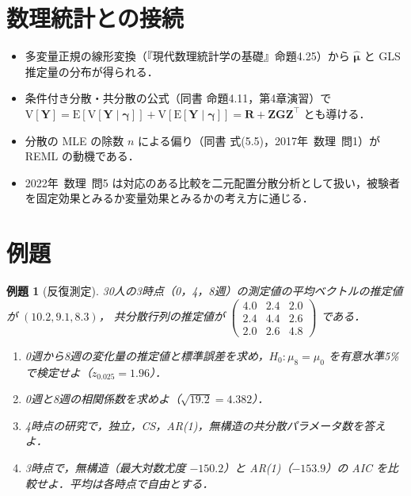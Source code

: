 \documentclass[a4paper,11pt,openany]{ltjsbook}
\newtheorem{reidai}{例題}[chapter]
\newcommand{\kakomonSM}[2]{\mbox{#1年 数理 問#2}}
\newcommand{\E}{\mathrm{E}}
\newcommand{\V}{\mathrm{V}}
\newcommand{\transp}{^{\top}}
\begin{document}
\section{数理統計との接続}\label{sec:08-link}
\begin{linkbox}
\begin{itemize}
\item 多変量正規の線形変換（『現代数理統計学の基礎』命題4.25）から $\hat{\bm\mu}$ と GLS 推定量の分布が得られる．
\item 条件付き分散・共分散の公式（同書 命題4.11，第4章演習）で $\V[\bm Y]=\E[\V[\bm Y\mid\bm\gamma]]+\V[\E[\bm Y\mid\bm\gamma]]=\bm R+\bm Z\bm G\bm Z\transp$ とも導ける．
\item 分散の MLE の除数 $n$ による偏り（同書 式(5.5)，\kakomonSM{2017}{1}）が REML の動機である．
\item \kakomonSM{2022}{5} は対応のある比較を二元配置分散分析として扱い，被験者を固定効果とみるか変量効果とみるかの考え方に通じる．
\end{itemize}
\end{linkbox}

\section{例題}\label{sec:08-ex}
\begin{reidai}[反復測定]\label{reidai:08-1}
30人の3時点（0，4，8週）の測定値の平均ベクトルの推定値が $(10.2,9.1,8.3)$，
共分散行列の推定値が $\begin{pmatrix}4.0&2.4&2.0\\2.4&4.4&2.6\\2.0&2.6&4.8\end{pmatrix}$ である．
\begin{enumerate}[label=(\arabic*)]
\item 0週から8週の変化量の推定値と標準誤差を求め，$H_0:\mu_8=\mu_0$ を有意水準5\%で検定せよ（$z_{0.025}=1.96$）．
\item 0週と8週の相関係数を求めよ（$\sqrt{19.2}=4.382$）．
\item 4時点の研究で，独立，CS，AR(1)，無構造の共分散パラメータ数を答えよ．
\item 3時点で，無構造（最大対数尤度 $-150.2$）と AR(1)（$-153.9$）の AIC を比較せよ．平均は各時点で自由とする．
\end{enumerate}
\end{reidai}
\end{document}
